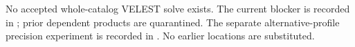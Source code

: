 No accepted whole-catalog VELEST solve exists. The current blocker is recorded in ; prior dependent products are quarantined. The separate alternative-profile precision experiment is recorded in . No earlier locations are substituted.
